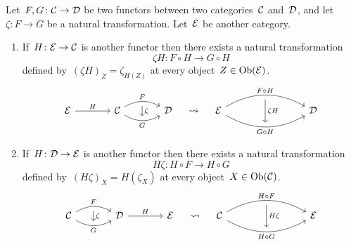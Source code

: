 




\begin{lemma*}
  Let~$F, G \colon \mathcal{C} \to \mathcal{D}$ be two functors between two categories~$\mathcal{C}$ and~$\mathcal{D}$, and let~$\zeta \colon F \to G$ be a natural transformation.
  Let~$\mathcal{E}$ be another category.
  \begin{enumerate}
    \item
      If~$H \colon \mathcal{E} \to \mathcal{C}$ is another functor then there exists a natural transformation
      \[
                \zeta H
        \colon  F \circ H
        \to     G \circ H
      \]
      defined by~$(\zeta H)_Z = \zeta_{H(Z)}$ at every object~$Z \in \operatorname{Ob}(\mathcal{E})$.
      \[
        \begin{tikzcd}[column sep = large]
            \Ecat
            \arrow{r}[above]{H}
          & \Ccat
            \arrow[bend left]{r}[above]{F}[below,name=U]{}
            \arrow[bend right]{r}[below]{G}[above,name=D]{}
            \arrow[from=U, to=D, right, "\zeta"]
          & \Dcat
        \end{tikzcd}
        \quad\leadsto\quad
        \begin{tikzcd}[column sep = large]
            \Ecat
            \arrow[bend left]{rr}[above]{F \circ H}[below,name=U]{}
            \arrow[bend right]{rr}[below]{G \circ H}[above,name=D]{}
            \arrow[from=U, to=D, right, "\zeta H"]
          & {}
          & \Dcat
        \end{tikzcd}
      \]
    \item
      If~$H \colon \mathcal{D} \to \mathcal{E}$ is another functor then there exists a natural transformation
      \[
                H \zeta
        \colon  H \circ F
        \to     H \circ G
      \]
      defined by~$(H \zeta)_X = H(\zeta_X)$ at every object~$X \in \operatorname{Ob}(\mathcal{C})$.
      \[
        \begin{tikzcd}[column sep = large]
            \Ccat
            \arrow[bend left]{r}[above]{F}[below,name=U]{}
            \arrow[bend right]{r}[below]{G}[above,name=D]{}
            \arrow[from=U, to=D, right, "\zeta"]
          & \Dcat
            \arrow{r}[above]{H}
          & \Ecat
        \end{tikzcd}
        \quad\leadsto\quad
        \begin{tikzcd}[column sep = large]
            \Ccat
            \arrow[bend left]{rr}[above]{H \circ F}[below,name=U]{}
            \arrow[bend right]{rr}[below]{H \circ G}[above,name=D]{}
            \arrow[from=U, to=D, right, "H \zeta"]
          & {}
          & \Ecat
        \end{tikzcd}
      \]
  \end{enumerate}
\end{lemma*}



